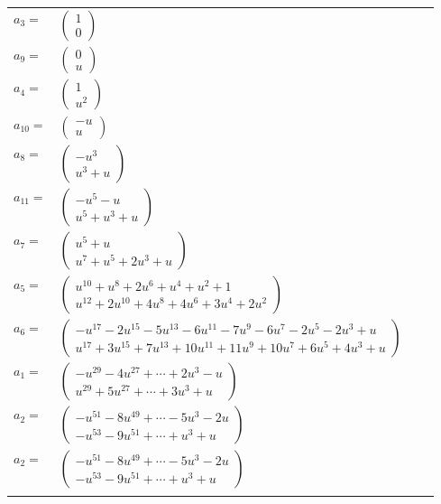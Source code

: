 \documentclass[1p]{elsarticle_modified}
\theoremstyle{definition}
\begin{document}
\begin{tabular}{m{7pt} m{180pt} m{7pt} m{180pt} }
\flushright $a_{3}=$&$\begin{pmatrix}1\\0\end{pmatrix}$ \\
\flushright $a_{9}=$&$\begin{pmatrix}0\\u\end{pmatrix}$ \\
\flushright $a_{4}=$&$\begin{pmatrix}1\\u^2\end{pmatrix}$ \\
\flushright $a_{10}=$&$\begin{pmatrix}- u\\u\end{pmatrix}$ \\
\flushright $a_{8}=$&$\begin{pmatrix}- u^3\\u^3+u\end{pmatrix}$ \\
\flushright $a_{11}=$&$\begin{pmatrix}- u^5- u\\u^5+u^3+u\end{pmatrix}$ \\
\flushright $a_{7}=$&$\begin{pmatrix}u^5+u\\u^7+u^5+2 u^3+u\end{pmatrix}$ \\
\flushright $a_{5}=$&$\begin{pmatrix}u^{10}+u^8+2 u^6+u^4+u^2+1\\u^{12}+2 u^{10}+4 u^8+4 u^6+3 u^4+2 u^2\end{pmatrix}$ \\
\flushright $a_{6}=$&$\begin{pmatrix}- u^{17}-2 u^{15}-5 u^{13}-6 u^{11}-7 u^9-6 u^7-2 u^5-2 u^3+u\\u^{17}+3 u^{15}+7 u^{13}+10 u^{11}+11 u^9+10 u^7+6 u^5+4 u^3+u\end{pmatrix}$ \\
\flushright $a_{1}=$&$\begin{pmatrix}- u^{29}-4 u^{27}+\cdots+2 u^3- u\\u^{29}+5 u^{27}+\cdots+3 u^3+u\end{pmatrix}$ \\
\flushright $a_{2}=$&$\begin{pmatrix}- u^{51}-8 u^{49}+\cdots-5 u^3-2 u\\- u^{53}-9 u^{51}+\cdots+u^3+u\end{pmatrix}$\\ \flushright $a_{2}=$&$\begin{pmatrix}- u^{51}-8 u^{49}+\cdots-5 u^3-2 u\\- u^{53}-9 u^{51}+\cdots+u^3+u\end{pmatrix}$\\&\end{tabular}
\end{document}
